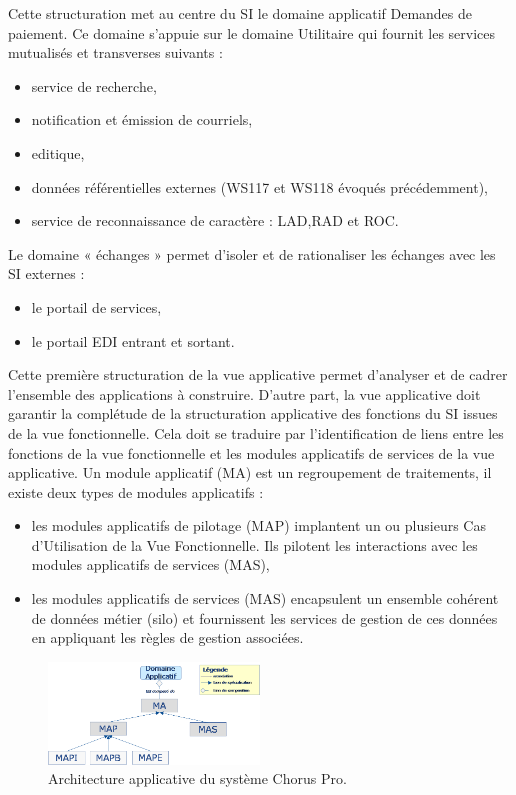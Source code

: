 \documentclass[12pt,a4paper]{article}
\begin{document}
\newpage
Cette structuration met au centre du SI le domaine applicatif Demandes de paiement.
Ce domaine s’appuie sur le domaine Utilitaire qui fournit les services mutualisés et transverses suivants :
\smallbreak
\begin{itemize}
\item	service de recherche,
\item	notification et émission de courriels,
\item	editique,
\item	données référentielles externes (WS117 et WS118 évoqués précédemment),
\item	service de reconnaissance de caractère : \gls{LAD},\gls{RAD} et \gls{ROC}.
\end{itemize}
\medbreak
Le domaine « échanges » permet d’isoler et de rationaliser les échanges avec les SI externes :
\smallbreak
\begin{itemize}
\item	le portail de services,
\item	le portail EDI entrant et sortant.
\end{itemize}
\medbreak
Cette première structuration de la vue applicative permet d’analyser et de cadrer l’ensemble des applications à construire. D’autre part, la vue applicative doit garantir la complétude de la structuration applicative des fonctions du SI issues de la vue fonctionnelle. Cela doit se traduire par l’identification de liens entre les fonctions de la vue fonctionnelle et les modules applicatifs de services de la vue applicative.
\smallbreak
Un module applicatif (MA) est un regroupement de traitements, il existe deux types de modules applicatifs :
\begin{itemize}
\item les modules applicatifs de pilotage (MAP) implantent un ou plusieurs Cas d’Utilisation de la Vue Fonctionnelle. Ils pilotent les interactions avec les modules applicatifs de services (MAS),
\item les modules applicatifs de services (MAS) encapsulent un ensemble cohérent de données métier (silo) et fournissent les services de gestion de ces données en appliquant les règles de gestion associées.
\end{itemize}
\begin{figure}[H]
	\begin{center}
		\includegraphics[width=0.5\textwidth, keepaspectratio]{archiApplicative.png}
		\caption{Architecture applicative du système Chorus Pro.}
	\end{center}
\end{figure}
\clearpage
\newpage
\end{document}
